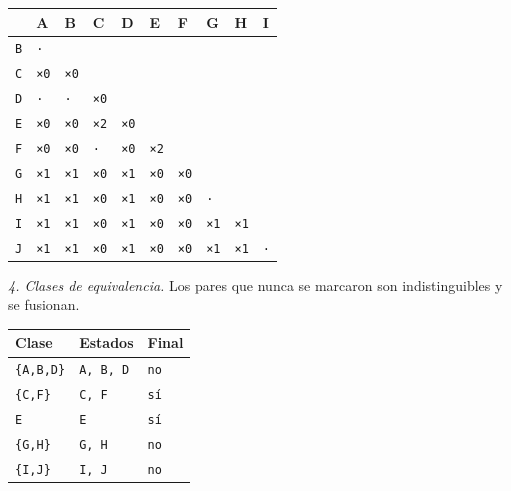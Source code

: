 \documentclass[11pt]{article}
\begin{document}
\begin{center}\footnotesize\begin{tabular}{llllllllll}\toprule
 & A & B & C & D & E & F & G & H & I \\\midrule
\texttt{B} & \texttt{·} & \texttt{} & \texttt{} & \texttt{} & \texttt{} & \texttt{} & \texttt{} & \texttt{} & \texttt{} \\
\texttt{C} & \texttt{×0} & \texttt{×0} & \texttt{} & \texttt{} & \texttt{} & \texttt{} & \texttt{} & \texttt{} & \texttt{} \\
\texttt{D} & \texttt{·} & \texttt{·} & \texttt{×0} & \texttt{} & \texttt{} & \texttt{} & \texttt{} & \texttt{} & \texttt{} \\
\texttt{E} & \texttt{×0} & \texttt{×0} & \texttt{×2} & \texttt{×0} & \texttt{} & \texttt{} & \texttt{} & \texttt{} & \texttt{} \\
\texttt{F} & \texttt{×0} & \texttt{×0} & \texttt{·} & \texttt{×0} & \texttt{×2} & \texttt{} & \texttt{} & \texttt{} & \texttt{} \\
\texttt{G} & \texttt{×1} & \texttt{×1} & \texttt{×0} & \texttt{×1} & \texttt{×0} & \texttt{×0} & \texttt{} & \texttt{} & \texttt{} \\
\texttt{H} & \texttt{×1} & \texttt{×1} & \texttt{×0} & \texttt{×1} & \texttt{×0} & \texttt{×0} & \texttt{·} & \texttt{} & \texttt{} \\
\texttt{I} & \texttt{×1} & \texttt{×1} & \texttt{×0} & \texttt{×1} & \texttt{×0} & \texttt{×0} & \texttt{×1} & \texttt{×1} & \texttt{} \\
\texttt{J} & \texttt{×1} & \texttt{×1} & \texttt{×0} & \texttt{×1} & \texttt{×0} & \texttt{×0} & \texttt{×1} & \texttt{×1} & \texttt{·} \\
\bottomrule\end{tabular}\end{center}
\textit{4. Clases de equivalencia.} Los pares que nunca se marcaron son indistinguibles y se fusionan.
\begin{center}\footnotesize\begin{tabular}{lll}\toprule
Clase & Estados & Final \\\midrule
\texttt{\{A,B,D\}} & \texttt{A, B, D} & \texttt{no} \\
\texttt{\{C,F\}} & \texttt{C, F} & \texttt{sí} \\
\texttt{E} & \texttt{E} & \texttt{sí} \\
\texttt{\{G,H\}} & \texttt{G, H} & \texttt{no} \\
\texttt{\{I,J\}} & \texttt{I, J} & \texttt{no} \\
\bottomrule\end{tabular}\end{center}
\end{document}
